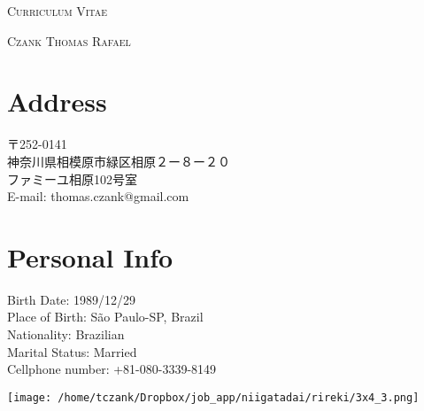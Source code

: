\documentclass[a4paper]{article}
\begin{document}
 
\pagestyle{empty}
 
\begin{center}
\huge{\textsc{Curriculum Vitae}}
\vspace{\baselineskip}
 
\Large{\textsc{Czank Thomas Rafael}}
\end{center}
\vspace{1.5\baselineskip}

\section{Address}
\begin{CJK}{UTF8}{ipxm}
  \begin{flushleft}
〒252-0141 　\\  
神奈川県相模原市緑区相原２ー８ー２０ \\
ファミーユ相原102号室 \\
E-mail: thomas.czank@gmail.com\\
\end{flushleft}
\end{CJK}

\section{Personal Info}
\begin{minipage}{0.5\textwidth}
\begin{flushleft}
  Birth Date: 1989/12/29  \\
  Place of Birth: São Paulo-SP, Brazil \\
  Nationality: Brazilian \\
  Marital Status: Married\\
  Cellphone number: +81-080-3339-8149\\
\end{flushleft}
\end{minipage}
\hfill
\begin{minipage}{0.5\textwidth}
\begin{flushright}
\hspace*{-2cm}
\texttt{[image: /home/tczank/Dropbox/job\_app/niigatadai/rireki/3x4\_3.png]}
\end{flushright}
\end{minipage}
\end{document}
